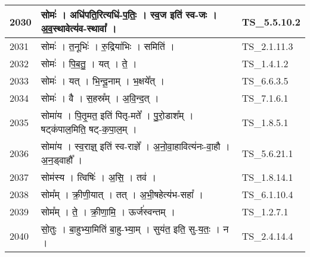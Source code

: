 \documentclass[17pt]{extarticle}
\begin{document}
\begin{longtable}{||p{0.4in}||p{4.9in}||p{0.9in}||}
    \hline
        
    2030 & सोमः॑   ।   अधि॑पति॒रित्यधि॑{-}प॒तिः॒   ।   स्व॒ज इति॑ स्व{-}जः   ।   अ॒व॒स्थावेत्य॑व{-}स्थावा᳚   ।    & TS\_5.5.10.2       \\
    
    \hline
        
    2031 & सोमः॑   ।   त॒नूभिः॑   ।   रु॒द्रिया॑भिः   ।   समिति॑   ।    & TS\_2.1.11.3       \\
    
    \hline
        
    2032 & सोमः॑   ।   पि॒ब॒तु॒   ।   यत्   ।   ते॒   ।    & TS\_1.4.1.2       \\
    
    \hline
        
    2033 & सोमः॑   ।   यत्   ।   भि॒न्दू॒नाम्   ।   भ॒क्षये᳚त्   ।    & TS\_6.6.3.5       \\
    
    \hline
        
    2034 & सोमः॑   ।   वै   ।   स॒हस्र᳚म्   ।   अ॒वि॒न्द॒त्   ।    & TS\_7.1.6.1       \\
    
    \hline
        
    2035 & सोमा॑य   ।   पि॒तृ॒मत॒ इति॑ पितृ{-}मते᳚   ।   पु॒रो॒डाश᳚म्   ।   षट्क॑पाल॒मिति॒ षट्{-}क॒पा॒ल॒म्   ।    & TS\_1.8.5.1       \\
    
    \hline
        
    2036 & सोमा॑य   ।   स्व॒राज्ञ्॒ इति॑ स्व{-}राज्ञे᳚   ।   अ॒नो॒वा॒हावित्य॑नः{-}वा॒हौ   ।   अ॒न॒ड्वाहौ᳚   ।    & TS\_5.6.21.1       \\
    
    \hline
        
    2037 & सोम॑स्य   ।   त्विषिः॑   ।   अ॒सि॒   ।   तव॑   ।    & TS\_1.8.14.1       \\
    
    \hline
        
    2038 & सोम᳚म्   ।   क्री॒णी॒यात्   ।   तत्   ।   अ॒भी॒षहेत्य॑भ{-}सहा᳚   ।    & TS\_6.1.10.4       \\
    
    \hline
        
    2039 & सोम᳚म्   ।   ते॒   ।   क्री॒णा॒मि॒   ।   ऊर्ज॑स्वन्तम्   ।    & TS\_1.2.7.1       \\
    
    \hline
        
    2040 & सो॒तुः   ।   बा॒हुभ्या॒मिति॑ बा॒हु{-}भ्या॒म्   ।   सुय॑त॒ इति॒ सु{-}य॒तः॒   ।   न   ।    & TS\_2.4.14.4       \\
    

\end{longtable}
\end{document}
